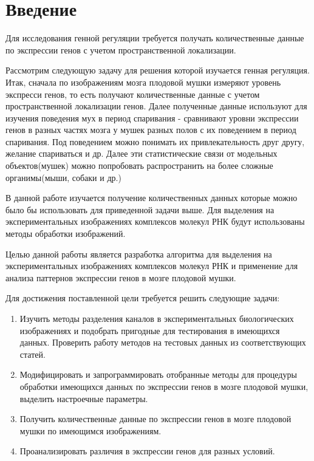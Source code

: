 \chapter*{Введение} %

Для исследования генной регуляции требуется получать количественные данные по экспрессии генов с учетом пространственной локализации.

Рассмотрим следующую задачу для решения которой изучается генная регуляция. Итак, сначала по изображениям мозга плодовой мушки измеряют уровень экспресси генов, то есть получают количественные данные с учетом пространственной локализации генов. Далее полученные данные используют для изучения поведения мух  в период спаривания - сравнивают уровни экспрессии генов в разных частях мозга у мушек разных полов с их поведением в период спаривания. Под поведением можно понимать их привлекательность друг другу, желание спариваться и др. Далее эти статистические связи от модельных объектов(мушек) можно попробовать распространить на более сложные органимы(мыши, собаки и др.)

В данной работе изучается получение количественных  данных которые можно было бы использовать для приведенной задачи выше. Для выделения на экспериментальных изображениях комплексов молекул РНК будут использованы методы обработки изображений.

Целью данной работы является разработка алгоритма для выделения на экспериментальных изображениях комплексов молекул РНК и применение для анализа паттернов экспрессии генов в мозге плодовой мушки.

Для достижения поставленной цели требуется решить следующие задачи:

\begin{enumerate}[1.]
	\item Изучить методы разделения каналов в экспериментальных биологических изображениях и подобрать пригодные для тестирования в имеющихся данных. Проверить работу методов на тестовых данных из соответствующих статей.
	\item Модифицировать и запрограммировать отобранные методы для процедуры обработки имеющихся данных по экспрессии генов в мозге плодовой мушки, выделить настроечные параметры.
	\item Получить количественные данные по экспрессии генов в мозге плодовой мушки по имеющимся изображениям.
	\item Проанализировать различия в экспрессии генов для разных условий.
\end{enumerate} 

